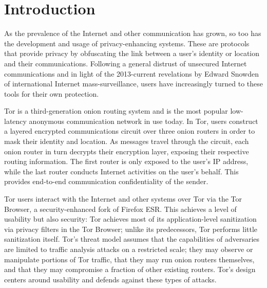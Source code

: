 \documentclass[USenglish,oneside,twocolumn]{article}
\begin{document}

 
\maketitle

\section{Introduction}

As the prevalence of the Internet and other communication has grown, so too has the development and usage of privacy-enhancing systems. These are protocols that provide privacy by obfuscating the link between a user's identity or location and their communications. Following a general distrust of unsecured Internet communications and in light of the 2013-current revelations by Edward Snowden of international Internet mass-surveillance, users have increasingly turned to these tools for their own protection.

Tor \cite{dingledine2004tor} is a third-generation onion routing system and is the most popular low-latency anonymous communication network in use today. In Tor, users construct a layered encrypted communications circuit over three onion routers in order to mask their identity and location. As messages travel through the circuit, each onion router in turn decrypts their encryption layer, exposing their respective routing information. The first router is only exposed to the user's IP address, while the last router conducts Internet activities on the user's behalf. This provides end-to-end communication confidentiality of the sender.


Tor users interact with the Internet and other systems over Tor via the Tor Browser, a security-enhanced fork of Firefox ESR. This achieves a level of usability but also security: Tor achieves most of its application-level sanitization via privacy filters in the Tor Browser; unlike its predecessors, Tor performs little sanitization itself. Tor's threat model assumes that the capabilities of adversaries are limited to traffic analysis attacks on a restricted scale; they may observe or manipulate portions of Tor traffic, that they may run onion routers themselves, and that they may compromise a fraction of other existing routers. Tor's design centers around usability and defends against these types of attacks.
\end{document}
